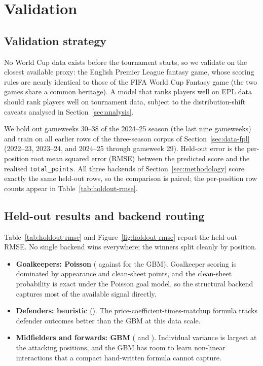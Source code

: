 \section{Validation}
\label{sec:validation}

\subsection{Validation strategy}
\label{sec:validation-strategy}

No World Cup data exists before the tournament starts, so we validate
on the closest available proxy: the English Premier League fantasy
game, whose scoring rules are nearly identical to those of the FIFA
World Cup Fantasy game (the two games share a common heritage). A
model that ranks players well on EPL data should rank players well on
tournament data, subject to the distribution-shift caveats analysed
in Section~\ref{sec:analysis}.

We hold out gameweeks 30--38 of the 2024--25 season (the last nine
gameweeks) and train on all earlier rows of the three-season corpus
of Section~\ref{sec:data-fpl} (2022--23, 2023--24, and 2024--25
through gameweek 29). Held-out error is the per-position root mean
squared error (RMSE) between the predicted score and the realised
\texttt{total\_points}. All three backends of
Section~\ref{sec:methodology} score exactly the same held-out rows,
so the comparison is paired; the per-position row counts appear in
Table~\ref{tab:holdout-rmse}.

\subsection{Held-out results and backend routing}
\label{sec:validation-holdout}

Table~\ref{tab:holdout-rmse} and Figure~\ref{fig:holdout-rmse} report
the held-out RMSE. No single backend wins everywhere; the winners
split cleanly by position.

\begin{itemize}
\item \textbf{Goalkeepers: Poisson} (\RmseGkPoisson{} against
  \RmseGkGbm{} for the GBM). Goalkeeper scoring is dominated by
  appearance and clean-sheet points, and the clean-sheet probability
  is exact under the Poisson goal model, so the structural backend
  captures most of the available signal directly.
\item \textbf{Defenders: heuristic} (\RmseDefHeuristic{}). The
  price-coefficient-times-matchup formula tracks defender outcomes
  better than the GBM at this data scale.
\item \textbf{Midfielders and forwards: GBM} (\RmseMidGbm{} and
  \RmseFwdGbm{}). Individual variance is largest at the attacking
  positions, and the GBM has room to learn non-linear interactions
  that a compact hand-written formula cannot capture.
\end{itemize}

